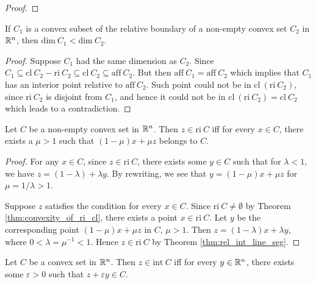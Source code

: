 \documentclass[11pt,a4paper]{article}
\begin{document}
\begin{proof}
    
\end{proof}

\begin{corollary}
    If $C_1$ is a convex subset of the relative boundary of a non-empty convex set $C_2$ in $\mathbb{R}^n$, then $\mathrm{dim}\ C_1<\mathrm{dim}\ C_2$.
\end{corollary}

\begin{proof}
    Suppose $C_1$ had the same dimension as $C_2$. Since $C_1\subseteq \mathrm{cl}\ C_2-\mathrm{ri}\ C_2\subseteq\mathrm{cl}\ C_2\subseteq\mathrm{aff}\ C_2$. But then $\mathrm{aff}\ C_1 = \mathrm{aff}\ C_2$ which implies that $C_1$ has an interior point relative to $\mathrm{aff}\ C_2$. Such point could not be in $\mathrm{cl}\ (\mathrm{ri}\ C_2)$, since $\mathrm{ri}\ C_2$ is disjoint from $C_1$, and hence it could not be in $\mathrm{cl}\ (\mathrm{ri}\ C_2) = \mathrm{cl}\ C_2$ which leads to a contradiction.
\end{proof}

\begin{theorem}\label{thm:ri_characterization_convex_sets}
    Let $C$ be a non-empty convex set in $\mathbb{R}^n$. Then $z\in \mathrm{ri}\ C$ iff for every $x\in C$, there exists a $\mu>1$ such that $(1-\mu) x + \mu z$ belongs to $C$.
\end{theorem}

\begin{proof}
    \forward For any $x\in C$, since $z\in \mathrm{ri}\ C$, there exists some $y\in C$ such that for $\lambda<1$, we have $z = (1-\lambda)+\lambda y$. By rewriting, we see that $y = (1-\mu)x+\mu z$ for $\mu =1/\lambda>1$. 

    \noindent \converse Suppose $z$ satisfies the condition for every $x\in C$. Since $\mathrm{ri}\ C\neq \emptyset$ by Theorem \ref{thm:convexity_of_ri_cl}, there exists a point $x\in \mathrm{ri}\ C$. Let $y$ be the corresponding point $(1-\mu)x+\mu z$ in $C$, $\mu >1$. Then $z = (1-\lambda)x+\lambda y$, where $0<\lambda = \mu^{-1}<1$. Hence $z\in \mathrm{ri}\ C$ by Theorem \ref{thm:rel_int_line_seg}. 
\end{proof}

\begin{corollary}
    Let $C$ be a convex set in $\mathbb{R}^n$. Then $z\in \mathrm{int}\ C$ iff for every $y\in \mathbb{R}^n$, there exists some $\varepsilon>0$ such that $z+\varepsilon y\in C$.
\end{corollary}
\end{document}
